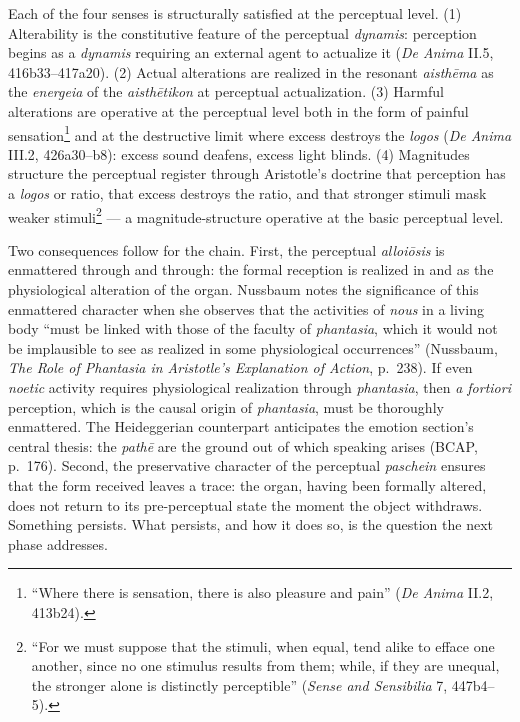 \documentclass{article}
\begin{document}
Each of the four senses is structurally satisfied at the perceptual level. (1) Alterability is the constitutive feature of the perceptual \textit{dynamis}: perception begins as a \textit{dynamis} requiring an external agent to actualize it (\textit{De Anima} II.5, 416b33--417a20). (2) Actual alterations are realized in the resonant \textit{aisthēma} as the \textit{energeia} of the \textit{aisthētikon} at perceptual actualization. (3) Harmful alterations are operative at the perceptual level both in the form of painful sensation\footnote{``Where there is sensation, there is also pleasure and pain'' (\textit{De Anima} II.2, 413b24).} and at the destructive limit where excess destroys the \textit{logos} (\textit{De Anima} III.2, 426a30--b8): excess sound deafens, excess light blinds. (4) Magnitudes structure the perceptual register through Aristotle's doctrine that perception has a \textit{logos} or ratio, that excess destroys the ratio, and that stronger stimuli mask weaker stimuli\footnote{``For we must suppose that the stimuli, when equal, tend alike to efface one another, since no one stimulus results from them; while, if they are unequal, the stronger alone is distinctly perceptible'' (\textit{Sense and Sensibilia} 7, 447b4--5).} --- a magnitude-structure operative at the basic perceptual level.

Two consequences follow for the chain. First, the perceptual \textit{alloiōsis} is enmattered through and through: the formal reception is realized in and as the physiological alteration of the organ. Nussbaum notes the significance of this enmattered character when she observes that the activities of \textit{nous} in a living body ``must be linked with those of the faculty of \textit{phantasia}, which it would not be implausible to see as realized in some physiological occurrences'' (Nussbaum, \textit{The Role of Phantasia in Aristotle's Explanation of Action}, p.~238). If even \textit{noetic} activity requires physiological realization through \textit{phantasia}, then \textit{a fortiori} perception, which is the causal origin of \textit{phantasia}, must be thoroughly enmattered. The Heideggerian counterpart anticipates the emotion section's central thesis: the \textit{pathē} are the ground out of which speaking arises (BCAP, p.~176). Second, the preservative character of the perceptual \textit{paschein} ensures that the form received leaves a trace: the organ, having been formally altered, does not return to its pre-perceptual state the moment the object withdraws. Something persists. What persists, and how it does so, is the question the next phase addresses.
\end{document}
